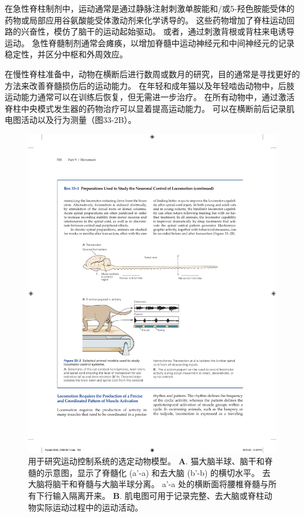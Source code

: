 \begin{proposition}[用于研究运动神经元控制的制剂]
	\quad \quad 在急性脊柱制剂中，运动通常是通过静脉注射刺激单胺能和/或5-羟色胺能受体的药物或局部应用谷氨酸能受体激动剂来化学诱导的。
	这些药物增加了脊柱运动回路的兴奋性，模仿了脑干的运动起始驱动。
	或者，通过刺激背根或背柱来电诱导运动。
	急性脊髓制剂通常会瘫痪，以增加脊髓中运动神经元和中间神经元的记录稳定性，并区分中枢和外周效应。
	
	\quad \quad 在慢性脊柱准备中，动物在横断后进行数周或数月的研究，目的通常是寻找更好的方法来改善脊髓损伤后的运动能力。
	在年轻和成年猫以及年轻啮齿动物中，后肢运动能力通常可以在训练后恢复，但无需进一步治疗。
	在所有动物中，通过激活脊柱中央模式发生器的药物治疗可以显着提高运动能力。
	可以在横断前后记录肌电图活动以及行为测量（图33-2B）。
	
\end{proposition}


\begin{figure}[htbp]
	\centering
	\includegraphics[width=0.7\linewidth]{chap33/fig_33_2}
	\caption{用于研究运动控制系统的选定动物模型。
	\textbf{A}. 猫大脑半球、脑干和脊髓的示意图，显示了脊髓化 (a'-a) 和去大脑 (b'-b) 的横切水平。
	去大脑将脑干和脊髓与大脑半球分离。
	a'-a 处的横断面将腰椎脊髓与所有下行输入隔离开来。
	\textbf{B}. 肌电图可用于记录完整、去大脑或脊柱动物实际运动过程中的运动活动。}
	\label{fig:33_2}
\end{figure}


